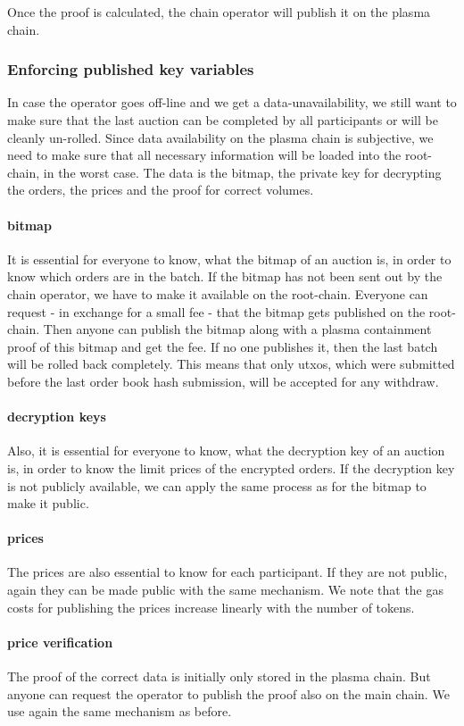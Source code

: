\documentclass[11pt,parskip=full]{scrartcl}%
\begin{document}
Once the proof is calculated, the chain operator will publish it on the plasma chain. 


\subsubsection{Enforcing published key variables}
\label{enforceAvailablity}
In case the operator goes off-line and we get a data-unavailability, we still want to make sure that the last auction can be completed by all participants or will be cleanly un-rolled. Since data availability on the plasma chain is subjective, we need to make sure that all necessary information will be loaded into the root-chain, in the worst case.
The data is the bitmap, the private key for decrypting the orders, the prices and the proof for correct volumes.
\paragraph{bitmap} It is essential for everyone to know, what the bitmap of an auction is, in order to know which orders are in the batch. If the bitmap has not been sent out by the chain operator, we have to make it available on the root-chain. Everyone can request - in exchange for a small fee - that the bitmap gets published on the root-chain. Then anyone can publish the bitmap along with a plasma containment proof of this bitmap and get the fee. If no one publishes it, then the last batch will be rolled back completely. This means that only utxos, which were submitted before the last order book hash submission, will be accepted for any withdraw.
\paragraph{decryption keys} Also, it is essential for everyone to know, what the decryption key of an auction is, in order to know the limit prices of the encrypted orders. If the decryption key is not publicly available, we can apply the same process as for the bitmap to make it public.

\paragraph{prices} The prices are also essential to know for each participant. If they are not public, again they can be made public with the same mechanism. We note that the gas costs for publishing the prices increase linearly with the number of tokens.

\paragraph{price verification} The proof of the correct data is initially only stored in the plasma chain. But anyone can request the operator to publish the proof also on the main chain. We use again the same mechanism as before.
\end{document}
